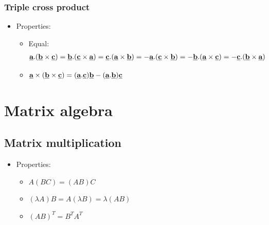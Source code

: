 \documentclass[10pt,a4paper]{article}
\begin{document}
\subsubsection{Triple cross product}

\begin{itemize}
    \item Properties:
    \begin{itemize}
        \item Equal:
        \begin{align*}
            \textbf{\underline{a}}.(\textbf{\underline{b}}\times \textbf{\underline{c}})=\textbf{\underline{b}}.(\textbf{\underline{c}}\times \textbf{\underline{a}})=\textbf{\underline{c}}.(\textbf{\underline{a}}\times \textbf{\underline{b}})=-\textbf{\underline{a}}.(\textbf{\underline{c}}\times \textbf{\underline{b}})=-\textbf{\underline{b}}.(\textbf{\underline{a}}\times \textbf{\underline{c}})=-\textbf{\underline{c}}.(\textbf{\underline{b}}\times \textbf{\underline{a}})
        \end{align*}
        \item $\textbf{\underline{a}} \times (\textbf{\underline{b}}\times \textbf{\underline{c}})=(\textbf{\underline{a}}.\textbf{\underline{c}})\textbf{\underline{b}}-(\textbf{\underline{a}}.\textbf{\underline{b}})\textbf{\underline{c}}$
    \end{itemize}
\end{itemize}

\pagebreak

\section{Matrix algebra}

\subsection{Matrix multiplication}

\begin{itemize}
    \item Properties:
    \begin{itemize}
        \item $A(BC)=(AB)C$
        \item $(\lambda A)B=A(\lambda B)=\lambda(AB)$
        \item $(AB)^T = B^T A^T$
    \end{itemize}
\end{itemize}
\end{document}
